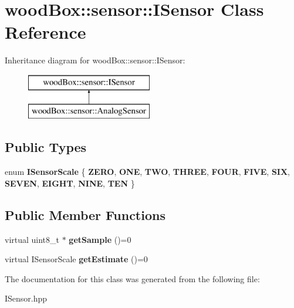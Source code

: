 \hypertarget{classwood_box_1_1sensor_1_1_i_sensor}{}\section{wood\+Box\+:\+:sensor\+:\+:I\+Sensor Class Reference}
\label{classwood_box_1_1sensor_1_1_i_sensor}
Inheritance diagram for wood\+Box\+:\+:sensor\+:\+:I\+Sensor\+:\begin{figure}[H]
\begin{center}
\leavevmode
\includegraphics[height=2.000000cm]{classwood_box_1_1sensor_1_1_i_sensor}
\end{center}
\end{figure}
\subsection*{Public Types}
\begin{DoxyCompactItemize}
\item 
\mbox{\label{classwood_box_1_1sensor_1_1_i_sensor_aa377bda61ed0d4a1d7e1a7bffe459452}} 
enum {\bfseries I\+Sensor\+Scale} \{ \newline
{\bfseries Z\+E\+RO}, 
{\bfseries O\+NE}, 
{\bfseries T\+WO}, 
{\bfseries T\+H\+R\+EE}, 
\newline
{\bfseries F\+O\+UR}, 
{\bfseries F\+I\+VE}, 
{\bfseries S\+IX}, 
{\bfseries S\+E\+V\+EN}, 
\newline
{\bfseries E\+I\+G\+HT}, 
{\bfseries N\+I\+NE}, 
{\bfseries T\+EN}
 \}
\end{DoxyCompactItemize}
\subsection*{Public Member Functions}
\begin{DoxyCompactItemize}
\item 
\mbox{\label{classwood_box_1_1sensor_1_1_i_sensor_a9de8041b991b76cc2f6fcc3b6a1bf363}} 
virtual uint8\+\_\+t $\ast$ {\bfseries get\+Sample} ()=0
\item 
\mbox{\label{classwood_box_1_1sensor_1_1_i_sensor_afb01c2473efc4a823bf5dada0048d2bc}} 
virtual I\+Sensor\+Scale {\bfseries get\+Estimate} ()=0
\end{DoxyCompactItemize}


The documentation for this class was generated from the following file\+:\begin{DoxyCompactItemize}
\item 
I\+Sensor.\+hpp\end{DoxyCompactItemize}
